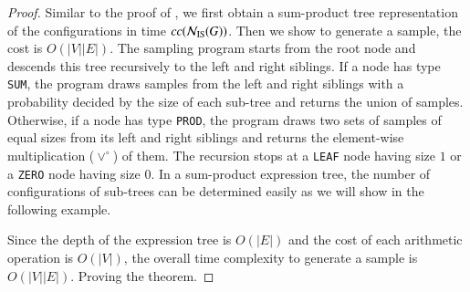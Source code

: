 \documentclass[review, onefignum, onetabnum]{siamart190516}
\begin{document}
\begin{proof}
Similar to the proof of , we first obtain a sum-product tree representation of the configurations in time $cc({\mathcal{N}_{\rm IS}(G)})$.
Then we show to generate a sample, the cost is $O(|V||E|)$.
The sampling program starts from the root node and descends this tree recursively to the left and right siblings.
If a node has type \texttt{SUM}, the program draws samples from the left and right siblings with a probability decided by the size of each sub-tree and returns the union of samples.
Otherwise, if a node has type \texttt{PROD}, the program draws two sets of samples of equal sizes from its left and right siblings and returns the element-wise multiplication ($\lor^\circ$) of them.
The recursion stops at a \texttt{LEAF} node having size $1$ or a \texttt{ZERO} node having size $0$.
In a sum-product expression tree, the number of configurations of sub-trees can be determined easily as we will show in the following example.

Since the depth of the expression tree is $O(|E|)$ and the cost of each arithmetic operation is $O(|V|)$, the overall time complexity to generate a sample is $O(|V||E|)$.
Proving the theorem.
\end{proof}
\end{document}
